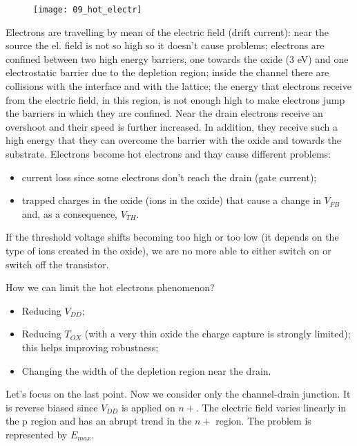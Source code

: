 \documentclass[a4paper, 12pt, twoside, openright]{report}
\begin{document}
	\begin{figure}[H]
	\centering
	\texttt{[image: 09\_hot\_electr]}
	\caption{}
	\label{}
	\end{figure}

Electrons are travelling by mean of the electric field (drift current): near the source the el. field is not so high so it doesn't cause problems; electrons are confined between two high energy barriers, one towards the oxide (3 eV) and one electrostatic barrier due to the depletion region; inside the channel there are collisions with the interface and with the lattice; the energy that electrons receive from the electric field, in this region, is not enough high to make electrons jump the barriers in which they are confined. Near the drain electrons receive an overshoot and their speed is further increased. In addition, they receive such a high energy that they can overcome the barrier with the oxide and towards the substrate. Electrons become hot electrons and thay cause different problems:

\begin{itemize}
\item current loss since some electrons don't reach the drain (gate current);
\item trapped charges in the oxide (ions in the oxide) that cause a change in $V_{FB}$ and, as a consequence, $V_{TH}$.
\end{itemize}

If the threshold voltage shifts becoming too high or too low (it depends on the type of ions created in the oxide), we are no more able to either switch on or switch off the transistor.

How we can limit the hot electrons phenomenon?

\begin{itemize}
\item Reducing $V_{DD}$;
\item Reducing $T_{OX}$ (with a very thin oxide the charge capture is strongly limited); this helps improving robustness;
\item Changing the width of the depletion region near the drain.
\end{itemize}

Let's focus on the last point. Now we consider only the channel-drain junction. It is reverse biased since $V_{DD}$ is applied on $n+$. The electric field varies linearly in the p region and has an abrupt trend in the $n+$ region. The problem is represented by $E_{max}$.
\end{document}

